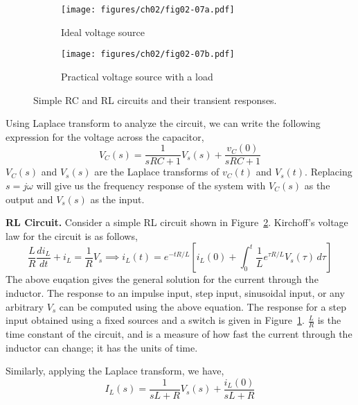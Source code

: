 \begin{figure}[t]
    \centering
    \begin{subfigure}{0.48\textwidth}
        \centering
        \texttt{[image: figures/ch02/fig02-07a.pdf]}
        \caption{Ideal voltage source}
        \label{fig:02-07a}
    \end{subfigure}
    \hfill
    \begin{subfigure}{0.48\textwidth}
        \centering
        \texttt{[image: figures/ch02/fig02-07b.pdf]}
        \caption{Practical voltage source with a load}
        \label{fig:02-07b}
    \end{subfigure}
    \caption{Simple RC and RL circuits and their transient responses.}
    \label{fig:02-07}
\end{figure}

Using Laplace transform to analyze the circuit, we can write the following expression for the voltage across the capacitor,
\begin{equation}
    V_C(s) = \frac{1}{sRC + 1} V_s(s) + \frac{v_C(0)}{sRC + 1}
    \label{eq:02-29}
\end{equation}
$V_C(s)$ and $V_s(s)$ are the Laplace transforms of $v_C(t)$ and $V_s(t)$. Replacing $s = j\omega$ will give us the frequency response of the system with $V_C(s)$ as the output and $V_s(s)$ as the input.

\noindent\textbf{RL Circuit.} Consider a simple RL circuit shown in Figure~\ref{fig:02-07b}. Kirchoff's voltage law for the circuit is as follows,
\begin{equation}
    \frac{L}{R} \frac{di_L}{dt} + i_L = \frac{1}{R}V_s \implies i_L(t) = e^{-tR/L} \left[ i_{L}(0) + \int_0^t \frac{1}{L} e^{\tau R/L} V_s(\tau)\, d\tau \right]
    \label{eq:02-30}
\end{equation}
The above euqation gives the general solution for the current through the inductor. The response to an impulse input, step input, sinusoidal input, or any arbitrary $V_s$ can be computed using the above equation. The response for a step input obtained using a fixed sources and a switch is given in Figure~\ref{fig:02-07a}. $\frac{L}{R}$ is the time constant of the circuit, and is a measure of how fast the current through the inductor can change; it has the units of time.

Similarly, applying the Laplace transform, we have,
\begin{equation}
    I_L(s) = \frac{1}{sL + R} V_s(s) + \frac{i_L(0)}{sL + R}
    \label{eq:02-31}
\end{equation}

